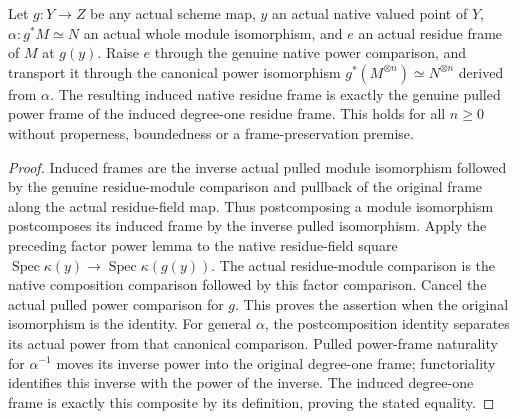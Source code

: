 \begin{theorem}\label{thm:actual-induced-residue-power-frame}
\leanok
{}
Let $g:Y\to Z$ be any actual scheme map, $y$ an actual native
valued point of $Y$, $\alpha:g^*M\simeq N$ an actual whole module
isomorphism, and $e$ an actual residue frame of $M$ at $g(y)$.
Raise $e$ through the genuine native power comparison, and
transport it through the canonical power isomorphism
$g^*(M^{\otimes n})\simeq N^{\otimes n}$ derived from $\alpha$.
The resulting induced native residue frame is exactly the genuine
pulled power frame of the induced degree-one residue frame.
This holds for all $n\geq0$ without properness, boundedness or a
frame-preservation premise.
\end{theorem}
\begin{proof}
Induced frames are the inverse actual pulled module isomorphism
followed by the genuine residue-module comparison and pullback
of the original frame along the actual residue-field map. Thus
postcomposing a module isomorphism postcomposes its induced frame
by the inverse pulled isomorphism. Apply the preceding factor
power lemma to the native residue-field square
$\operatorname{Spec}\kappa(y)\to\operatorname{Spec}\kappa(g(y))$.
The actual residue-module comparison is the native composition
comparison followed by this factor comparison. Cancel the actual
pulled power comparison for $g$. This proves the assertion when
the original isomorphism is the identity. For general $\alpha$,
the postcomposition identity separates its actual power from
that canonical comparison. Pulled power-frame naturality for
$\alpha^{-1}$ moves its inverse power into the original
degree-one frame; functoriality identifies this inverse with the
power of the inverse. The induced degree-one frame is exactly
this composite by its definition, proving the stated equality.
\end{proof}

